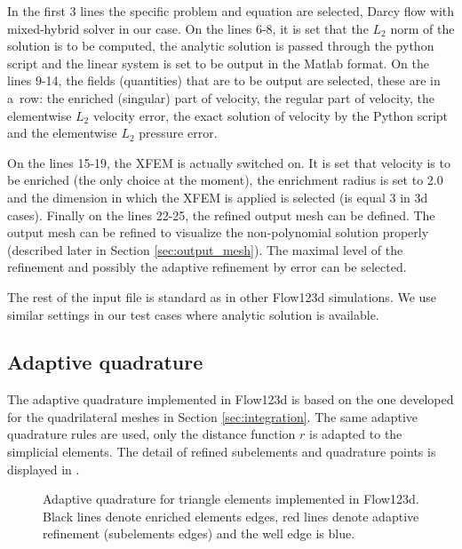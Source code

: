% 
In the first 3 lines the specific problem and equation are selected,
Darcy flow with mixed-hybrid solver in our case. On the lines 6-8, it is set that the $L_2$ norm of the solution is to be computed,
the analytic solution is passed through the python script and the linear system is set to be output in the Matlab format.
On the lines 9-14, the fields (quantities) that are to be output are selected, these are in a~row: the enriched (singular) part of velocity,
the regular part of velocity, the elementwise $L_2$ velocity error, the exact solution of velocity by the Python script and the elementwise $L_2$ pressure error.

On the lines 15-19, the XFEM is actually switched on. It is set that velocity is to be enriched (the only choice at the moment),
the enrichment radius is set to 2.0 and the dimension in which the XFEM is applied is selected (is equal 3 in 3d cases).
Finally on the lines 22-25, the refined output mesh can be defined. The output mesh can be refined to visualize the non-polynomial solution properly
(described later in Section \ref{sec:output_mesh}). The maximal level of the refinement and possibly the adaptive refinement by error can be selected.

The rest of the input file is standard as in other Flow123d simulations.
We use similar settings in our test cases where analytic solution is available.




\subsection{Adaptive quadrature}
The adaptive quadrature implemented in Flow123d is based on the one developed for the quadrilateral meshes
in Section \ref{sec:integration}. The same adaptive quadrature rules are used, only the distance function $r$
is adapted to the simplicial elements. The detail of refined subelements and quadrature points
is displayed in .
%
\begin{figure}[!htb]
  \centering    
  \hspace{0pt}
  \caption[Adaptive quadrature in Flow123d.]
  {Adaptive quadrature for triangle elements implemented in Flow123d.
   Black lines denote enriched elements edges, red lines denote adaptive refinement (subelements edges) and the well
   edge is blue.
  }
  \label{fig:adapt_refinement_flow123d}
\end{figure}


